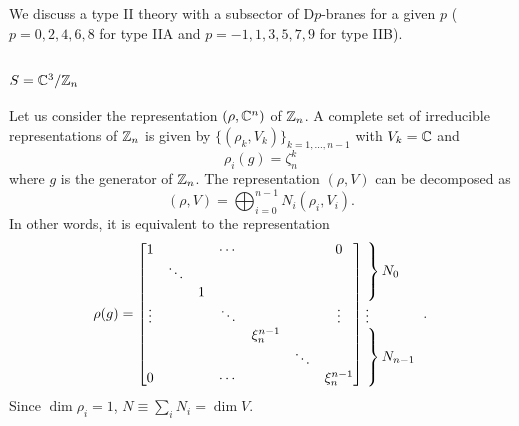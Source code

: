 \documentclass[a4paper,11pt]{article}
\begin{document}
        We discuss a type II theory with a subsector of D$p$-branes for a given $p$ ($p=0,2,4,6,8$ for type IIA and $p=-1,1,3,5,7,9$ for type IIB).

    \subsection{$S=\mathbb{C}^3/\mathbb{Z}_n$}

       Let us consider the representation $(\rho,\mathbb{C}^n)$ of $\mathbb{Z}_n$. A complete set of irreducible representations of $\mathbb{Z}_n$ is given by $\{(\rho_k,V_k)\}_{k=1,\dots,n-1}$ with $V_k=\mathbb{C}$ and
       \begin{equation}
        \rho_i(g)=\zeta^k_n
       \end{equation}
       where $g$ is the generator of $\mathbb{Z}_n$. The representation $(\rho,V)$ can be decomposed as
        \begin{equation}
            (\rho,V)=\bigoplus^{n-1}_{i=0}N_i(\rho_i,V_i).
        \end{equation}
        In other words, it is equivalent to the representation
        \begin{equation}
            \rho(g)=
            \begin{bmatrix}
                1 & & & \cdots & & & 0 \\
                 & \ddots & & & & & \\
                 & & 1 & & & &  \\
                \vdots & & & \ddots & & & \vdots \\
                 & & & & \xi^{n-1}_n & & \\
                 & & & & & \ddots & \\
                0 & & & \cdots & & & \xi^{n-1}_n 
            \end{bmatrix}
            \hspace{-0.2cm}
            \begin{tabular}{l}
            $\left.\lefteqn{\phantom{
                \begin{matrix}
                     a_0\\ \ddots\\ a_0\ 
                \end{matrix} 
            }}\right\}N_0$\\
            \vdots \\
            $\left.\lefteqn{\phantom{
                \begin{matrix}
                    b_0\\ \ddots\\ b_0\ 
                \end{matrix}
            }} \right\}N_{n-1}$
            \end{tabular}.\label{eq:reprrhoZn}
        \end{equation}
        Since $\dim\rho_i=1$, $N\equiv\sum_i N_i = \dim V$. 
        
\end{document}
